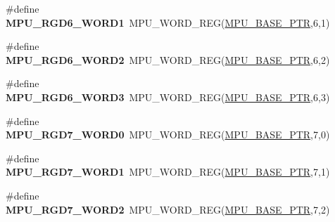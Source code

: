 \begin{DoxyCompactItemize}
\item 
\hypertarget{group___m_p_u___register___accessor___macros_gaed36481f3a64687f55a12c42d8af6c1b}{}\#define {\bfseries M\+P\+U\+\_\+\+R\+G\+D6\+\_\+\+W\+O\+R\+D1}~M\+P\+U\+\_\+\+W\+O\+R\+D\+\_\+\+R\+E\+G(\hyperlink{group___m_p_u___peripheral_gae2d60f80178d84225d77e5f0214d1f1d}{M\+P\+U\+\_\+\+B\+A\+S\+E\+\_\+\+P\+T\+R},6,1)\label{group___m_p_u___register___accessor___macros_gaed36481f3a64687f55a12c42d8af6c1b}

\item 
\hypertarget{group___m_p_u___register___accessor___macros_ga59bdc9a413fde445d2420dcb633d8423}{}\#define {\bfseries M\+P\+U\+\_\+\+R\+G\+D6\+\_\+\+W\+O\+R\+D2}~M\+P\+U\+\_\+\+W\+O\+R\+D\+\_\+\+R\+E\+G(\hyperlink{group___m_p_u___peripheral_gae2d60f80178d84225d77e5f0214d1f1d}{M\+P\+U\+\_\+\+B\+A\+S\+E\+\_\+\+P\+T\+R},6,2)\label{group___m_p_u___register___accessor___macros_ga59bdc9a413fde445d2420dcb633d8423}

\item 
\hypertarget{group___m_p_u___register___accessor___macros_ga347f3e9804d6d7c9ff0a6067282e44fe}{}\#define {\bfseries M\+P\+U\+\_\+\+R\+G\+D6\+\_\+\+W\+O\+R\+D3}~M\+P\+U\+\_\+\+W\+O\+R\+D\+\_\+\+R\+E\+G(\hyperlink{group___m_p_u___peripheral_gae2d60f80178d84225d77e5f0214d1f1d}{M\+P\+U\+\_\+\+B\+A\+S\+E\+\_\+\+P\+T\+R},6,3)\label{group___m_p_u___register___accessor___macros_ga347f3e9804d6d7c9ff0a6067282e44fe}

\item 
\hypertarget{group___m_p_u___register___accessor___macros_ga616e31b29165971c5cf0aadbc3afbe0d}{}\#define {\bfseries M\+P\+U\+\_\+\+R\+G\+D7\+\_\+\+W\+O\+R\+D0}~M\+P\+U\+\_\+\+W\+O\+R\+D\+\_\+\+R\+E\+G(\hyperlink{group___m_p_u___peripheral_gae2d60f80178d84225d77e5f0214d1f1d}{M\+P\+U\+\_\+\+B\+A\+S\+E\+\_\+\+P\+T\+R},7,0)\label{group___m_p_u___register___accessor___macros_ga616e31b29165971c5cf0aadbc3afbe0d}

\item 
\hypertarget{group___m_p_u___register___accessor___macros_ga6859cb5a282a17348e973197e8c1c62c}{}\#define {\bfseries M\+P\+U\+\_\+\+R\+G\+D7\+\_\+\+W\+O\+R\+D1}~M\+P\+U\+\_\+\+W\+O\+R\+D\+\_\+\+R\+E\+G(\hyperlink{group___m_p_u___peripheral_gae2d60f80178d84225d77e5f0214d1f1d}{M\+P\+U\+\_\+\+B\+A\+S\+E\+\_\+\+P\+T\+R},7,1)\label{group___m_p_u___register___accessor___macros_ga6859cb5a282a17348e973197e8c1c62c}

\item 
\hypertarget{group___m_p_u___register___accessor___macros_gab4ff2e389ffa299dde54ae725538f47e}{}\#define {\bfseries M\+P\+U\+\_\+\+R\+G\+D7\+\_\+\+W\+O\+R\+D2}~M\+P\+U\+\_\+\+W\+O\+R\+D\+\_\+\+R\+E\+G(\hyperlink{group___m_p_u___peripheral_gae2d60f80178d84225d77e5f0214d1f1d}{M\+P\+U\+\_\+\+B\+A\+S\+E\+\_\+\+P\+T\+R},7,2)\label{group___m_p_u___register___accessor___macros_gab4ff2e389ffa299dde54ae725538f47e}


\end{DoxyCompactItemize}
